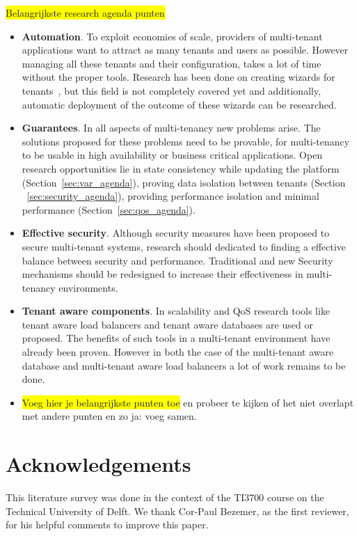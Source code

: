 \documentclass{article}
\newcommand{\highlight}[1]{\colorbox{yellow}{#1}}
\begin{document}
\highlight{Belangrijkste research agenda punten}
\begin{itemize}

\item \textbf{Automation}. 
To exploit economies of scale, providers of multi-tenant applications want to attract as many tenants and users as possible. 
However managing all these tenants and their configuration, takes a lot of time without the proper tools. 
Research has been done on creating wizards for tenants~\cite{mietzner2008generation,mietzner2008defining}, but this field is not completely covered yet and additionally, automatic deployment of the outcome of these wizards can be researched. 
\item \textbf{Guarantees}. 
In all aspects of multi-tenancy new problems arise. 
The solutions proposed for these problems need to be provable, for multi-tenancy to be usable in high availability or business critical applications. 
Open research opportunities lie in state consistency while updating the platform (Section~\ref{sec:var_agenda}), proving data isolation between tenants (Section ~\ref{sec:security_agenda}), providing performance isolation and minimal performance (Section~\ref{sec:qos_agenda}).
\item \textbf{Effective security}.
Although security measures have been proposed to secure multi-tenant systems, research should dedicated to finding a effective balance between security and performance. Traditional and new Security mechanisms should be redesigned to increase their effectiveness in multi-tenancy environments.
\item \textbf{Tenant aware components}.
In scalability and \ac{QoS} research tools like tenant aware load balancers and tenant aware databases are used or proposed.
The benefits of such tools in a multi-tenant environment have already been proven.
However in both the case of the multi-tenant aware database and multi-tenant aware load balancers a lot of work remains to be done.

\item \highlight{Voeg hier je belangrijkste punten toe}  en probeer te kijken of het niet overlapt met andere punten en zo ja: voeg samen.
\end{itemize}

\section{Acknowledgements}
This literature survey was done in the context of the TI3700 course on the Technical University of Delft. We thank Cor-Paul Bezemer, as the first reviewer, for his helpful comments to improve this paper.



\end{document}
